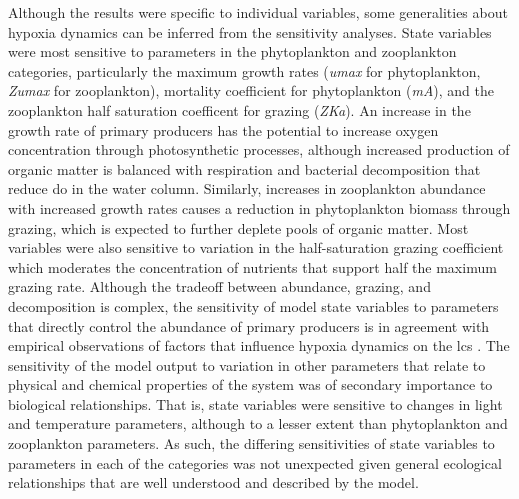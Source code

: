 \documentclass[letterpaper,12pt,oneside]{article}\usepackage[]{graphicx}\usepackage[]{color}
\begin{document}
Although the results were specific to individual variables, some generalities about hypoxia dynamics can be inferred from the sensitivity analyses. State variables were most sensitive to parameters in the phytoplankton and zooplankton categories, particularly the maximum growth rates (\textit{umax} for phytoplankton, \textit{Zumax} for zooplankton), mortality coefficient for phytoplankton (\textit{mA}), and the zooplankton half saturation coefficent for grazing (\textit{ZKa}). An increase in the growth rate of primary producers has the potential to increase oxygen concentration through photosynthetic processes, although increased production of organic matter is balanced with respiration and bacterial decomposition that reduce \ac{do} in the water column.  Similarly, increases in zooplankton abundance with increased growth rates causes a reduction in phytoplankton biomass through grazing, which is expected to further deplete pools of organic matter.  Most variables were also sensitive to variation in the half-saturation grazing coefficient which moderates the concentration of nutrients that support half the maximum grazing rate. Although the tradeoff between abundance, grazing, and decomposition is complex, the sensitivity of model state variables to parameters that directly control the abundance of primary producers is in agreement with empirical observations of factors that influence hypoxia dynamics on the \ac{lcs} \citep{Fahnenstiel95,Roelke00,Eldridge10}. The sensitivity of the model output to variation in other parameters that relate to physical and chemical properties of the system was of secondary importance to biological relationships.  That is, state variables were sensitive to changes in light and temperature parameters, although to a lesser extent than phytoplankton and zooplankton parameters.  As such, the differing sensitivities of state variables to parameters in each of the categories was not unexpected given general ecological relationships that are well understood and described by the model.    
\end{document}

